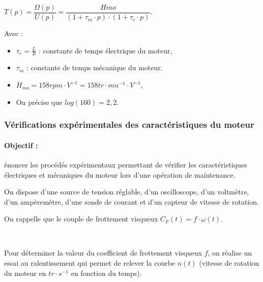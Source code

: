 \begin{center}
$T(p)=\dfrac{\Omega(p)}{U(p)}=\dfrac{Hmo}{(1+\tau_m\cdot p)\cdot (1+\tau_e\cdot p)}$.
\end{center}

Avec :
\begin{itemize}
 \item $\tau_e=\frac{L}{R}$ : constante de temps électrique du moteur,
 \item $\tau_m$ : constante de temps mécanique du moteur.
 \item $H_{mo}=158rpm\cdot V^{-1}=158tr\cdot mn^{-1}\cdot V^{-1}$,
 \item On précise que $log(160)=2,2$.
\end{itemize}


\subsubsection{Vérifications expérimentales des caractéristiques du moteur}

\paragraph{Objectif :} énoncer les procédés expérimentaux permettant de vérifier les caractéristiques électriques et mécaniques du moteur lors d'une opération de maintenance.

\newpage

On dispose d'une source de tension réglable, d'un oscilloscope, d'un voltmètre, d'un ampèremètre, d'une sonde de courant et d'un capteur de vitesse de rotation.


On rappelle que le couple de frottement visqueux $C_F(t)=f\cdot\omega(t)$.

~\

Pour déterminer la valeur du coefficient de frottement visqueux $f$, on réalise un essai au ralentissement qui permet de relever la courbe $n(t)$ (vitesse de rotation du moteur en $tr\cdot s^{-1}$ en fonction du temps).

